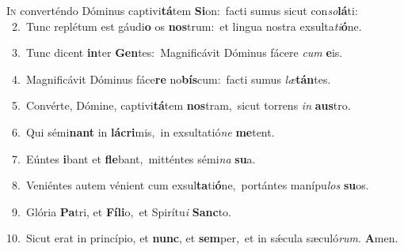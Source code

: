 \lettrine{\initial\textcolor{\initialcolor}{I}}{n} converténdo Dóminus captivi\-\textbf{tá}\-tem \textbf{Si}\-on:~\star facti sumus sicut con\-\textit{so}\-\textbf{lá}ti:\\
{\numbfont\textcolor{\numbcolor}{~2.}}~Tunc replétum est gáudi\textbf{o} os \textbf{nos}\-trum:~\star et lingua nostra exsulta\-\textit{ti}\-\textbf{ó}ne.\par
{\numbfont\textcolor{\numbcolor}{~3.}}~Tunc dicent \textbf{in}\-ter \textbf{Gen}\-tes:~\star Magnificávit Dóminus fácere \textit{cum} \textbf{e}\-is.\par
{\numbfont\textcolor{\numbcolor}{~4.}}~Magnificávit Dóminus fáce\textbf{re} no\-\textbf{bís}\-cum:~\star facti sumus \textit{læ}\-\textbf{tán}tes.\par
{\numbfont\textcolor{\numbcolor}{~5.}}~Convérte, Dómine, captivi\-\textbf{tá}\-tem \textbf{nos}\-tram,~\star sicut torrens \textit{in} \textbf{aus}\-tro.\par
{\numbfont\textcolor{\numbcolor}{~6.}}~Qui sémi\textbf{nant} in \textbf{lá}\-\textbf{cri}mis,~\star in exsultatió\textit{ne} \textbf{me}\-tent.\par
{\numbfont\textcolor{\numbcolor}{~7.}}~Eúntes \textbf{i}\-bant et \textbf{fle}\-bant,~\star mitténtes sémi\textit{na} \textbf{su}\-a.\par
{\numbfont\textcolor{\numbcolor}{~8.}}~Veniéntes autem vénient cum exsul\-\textbf{ta}\-ti\-\textbf{ó}\-ne,~\star portántes manípu\textit{los} \textbf{su}\-os.\par
{\numbfont\textcolor{\numbcolor}{~9.}}~Glória \textbf{Pa}\-tri, et \textbf{Fí}\-\textbf{li}o,~\star et Spirítu\textit{i} \textbf{Sanc}\-to.\par
{\numbfont\textcolor{\numbcolor}{10.}}~Sicut erat in princípio, et \textbf{nunc}\-, et \textbf{sem}\-per,~\star et in sǽcula sæculó\-\textit{rum}\-. \textbf{A}\-men.\par
